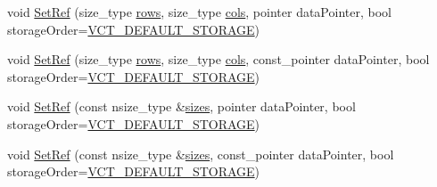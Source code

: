 {\bf }\par
\begin{DoxyCompactItemize}
\item 
void \hyperlink{classvct_dynamic_const_matrix_ref_ae05ea695c1eb51d2f8632fa6c2ce1e6e}{Set\+Ref} (size\+\_\+type \hyperlink{classvct_dynamic_const_matrix_base_a5eac13be2207ebeb8766cde379d73438}{rows}, size\+\_\+type \hyperlink{classvct_dynamic_const_matrix_base_aa6c51d41a100da49a7e7ac7edb20ecd9}{cols}, pointer data\+Pointer, bool storage\+Order=\hyperlink{vct_forward_declarations_8h_aacdb3b0140beef8a3c2025b808b74a73}{V\+C\+T\+\_\+\+D\+E\+F\+A\+U\+L\+T\+\_\+\+S\+T\+O\+R\+A\+G\+E})
\item 
void \hyperlink{classvct_dynamic_const_matrix_ref_a0afe73831f2a882072a2bdf370c22bea}{Set\+Ref} (size\+\_\+type \hyperlink{classvct_dynamic_const_matrix_base_a5eac13be2207ebeb8766cde379d73438}{rows}, size\+\_\+type \hyperlink{classvct_dynamic_const_matrix_base_aa6c51d41a100da49a7e7ac7edb20ecd9}{cols}, const\+\_\+pointer data\+Pointer, bool storage\+Order=\hyperlink{vct_forward_declarations_8h_aacdb3b0140beef8a3c2025b808b74a73}{V\+C\+T\+\_\+\+D\+E\+F\+A\+U\+L\+T\+\_\+\+S\+T\+O\+R\+A\+G\+E})
\item 
void \hyperlink{classvct_dynamic_const_matrix_ref_aa1caf7e102fffe86be3b3f806b9920bc}{Set\+Ref} (const nsize\+\_\+type \&\hyperlink{classvct_dynamic_const_matrix_base_ab8946f5d9d05321fcadf07f65dc314ce}{sizes}, pointer data\+Pointer, bool storage\+Order=\hyperlink{vct_forward_declarations_8h_aacdb3b0140beef8a3c2025b808b74a73}{V\+C\+T\+\_\+\+D\+E\+F\+A\+U\+L\+T\+\_\+\+S\+T\+O\+R\+A\+G\+E})
\item 
void \hyperlink{classvct_dynamic_const_matrix_ref_a3e48c5560436209a89858c031a6d1122}{Set\+Ref} (const nsize\+\_\+type \&\hyperlink{classvct_dynamic_const_matrix_base_ab8946f5d9d05321fcadf07f65dc314ce}{sizes}, const\+\_\+pointer data\+Pointer, bool storage\+Order=\hyperlink{vct_forward_declarations_8h_aacdb3b0140beef8a3c2025b808b74a73}{V\+C\+T\+\_\+\+D\+E\+F\+A\+U\+L\+T\+\_\+\+S\+T\+O\+R\+A\+G\+E})
\end{DoxyCompactItemize}

